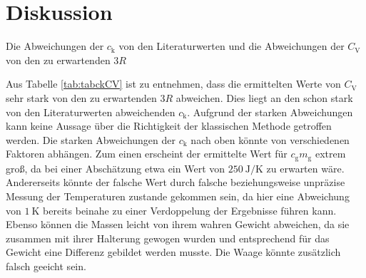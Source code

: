 
\section{Diskussion}
\label{sec:Diskussion}

\begin{table}
	\centering
	\caption{Die Abweichungen der $c_\text{k}$ von den Literaturwerten \cite{clit} und die Abweichungen der $C_\text{V}$ von den zu erwartenden $3R$}
	
	\label{tab:tabckCV}
\end{table}
\noindent Aus Tabelle \ref{tab:tabckCV} ist zu entnehmen, dass die ermittelten Werte von $C_\text{V}$ sehr stark von den zu erwartenden $3R$ abweichen. Dies liegt an den schon stark von den Literaturwerten abweichenden $c_\text{k}$. Aufgrund der starken Abweichungen kann keine Aussage über die Richtigkeit der klassischen Methode getroffen werden. \newline
Die starken Abweichungen der $c_\text{k}$ nach oben könnte von verschiedenen Faktoren abhängen. Zum einen erscheint der ermittelte Wert für $c_\text{g}m_\text{g}$ extrem groß, da bei einer Abschätzung etwa ein Wert von $\SI{250}{\joule\per\kelvin}$ zu erwarten wäre.\newline
Andererseits könnte der falsche Wert durch falsche beziehungsweise unpräzise Messung der Temperaturen zustande gekommen sein, da hier eine Abweichung von $\SI{1}{\kelvin}$ bereits beinahe zu einer Verdoppelung der Ergebnisse führen kann.\newline
Ebenso können die Massen leicht von ihrem wahren Gewicht abweichen, da sie zusammen mit ihrer Halterung gewogen wurden und entsprechend für das Gewicht eine Differenz gebildet werden musste. Die Waage könnte zusätzlich falsch geeicht sein. 

